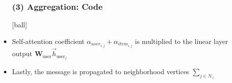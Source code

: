 \documentclass{beamer}
\begin{document}
\begin{frame}[fragile]
\begin{itemize}
\frametitle{(3) Aggregation: Code}
[ball]

\item Self-attention coefficient $\alpha_{user_{i,j}}+\alpha_{item_{i,j}}$ is multiplied to the linear layer output $\mathbf{W}_{\text{user}}\overrightarrow{h}_{\text{user}_j}$



\item Lastly, the message is propagated to neighborhood vertices $\sum_{j \in \mathcal{N}_{i}}$


\end{itemize}
\end{frame}

\end{document}
